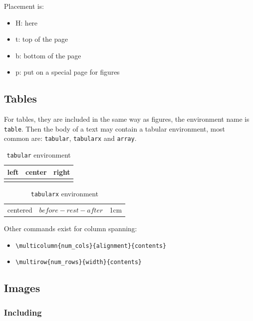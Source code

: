 Placement is:
\begin{itemize}
\item H: here
\item t: top of the page
\item b: bottom of the page
\item p: put on a special page for figures
\end{itemize}

\subsection{Tables}

For tables, they are included in the same way as figures, the environment name
is \texttt{table}.
Then the body of a text may contain a tabular environment, most common are:
\texttt{tabular}, \texttt{tabularx} and \texttt{array}.

\begin{table}[H]
\centering
\begin{tabular}{l|c|r}
\hline\hline
left & center & right \\
\hline
\hspace{2cm} & \hspace{2cm} & \hspace{2cm} \\
\end{tabular}
\caption{\texttt{tabular} environment}
\end{table}

\begin{table}[H]
\centering
\begin{tabularx}{0.8\linewidth}{|c|>{\centering $before-}X<{-after$}|p{1cm}|}
centered & rest & 1cm \\
\end{tabularx}
\caption{\texttt{tabularx} environment}
\end{table}

Other commands exist for column spanning:
\begin{itemize}
\item \lstinline$\multicolumn{num_cols}{alignment}{contents}$
\item \lstinline$\multirow{num_rows}{width}{contents}$
\end{itemize}

\subsection{Images}

\subsubsection{Including}

